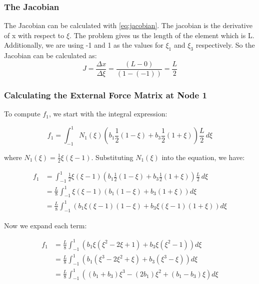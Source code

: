 \documentclass{article}
\begin{document}
\subsubsection*{The Jacobian}
The Jacobian can be calculated with \ref{eq:jacobian}. The jacobian is the derivative of x with respect to $\xi$. The problem gives us the 
length of the element which is L. Additionally, we are using -1 and 1 as the values for $\xi_1$ and $\xi_3$ respectively. So the Jacobian can
be calculated as:
\begin{equation*}
    J = \frac{\Delta x}{\Delta \xi} = \frac{(L-0)}{(1-(-1))} = \frac{L}{2}
\end{equation*}

\subsubsection*{Calculating the External Force Matrix at Node 1}

To compute \( f_1 \), we start with the integral expression:

\begin{equation}
    f_1 = \int_{-1}^{1} N_1(\xi) \left( b_1 \frac{1}{2}(1 - \xi) + b_3 \frac{1}{2}(1 + \xi) \right) \frac{L}{2} \, d\xi
\end{equation}

where \( N_1(\xi) = \frac{1}{2} \xi (\xi - 1) \). Substituting \( N_1(\xi) \) into the equation, we have:

\begin{align*}
    f_1 &= \int_{-1}^{1} \frac{1}{2} \xi (\xi - 1) \left( b_1 \frac{1}{2}(1 - \xi) + b_3 \frac{1}{2}(1 + \xi) \right) \frac{L}{2} \, d\xi \\
    &= \frac{L}{8} \int_{-1}^{1} \xi (\xi - 1) \left( b_1(1 - \xi) + b_3(1 + \xi) \right) d\xi \\
    &= \frac{L}{8} \int_{-1}^{1} \left( b_1 \xi (\xi - 1)(1 - \xi) + b_3 \xi (\xi - 1)(1 + \xi) \right) d\xi
\end{align*}

Now we expand each term:

\begin{align*}
    f_1 &= \frac{L}{8} \int_{-1}^{1} \left( b_1 \xi (\xi^2 - 2\xi + 1) + b_3 \xi (\xi^2 - 1) \right) d\xi \\
    &= \frac{L}{8} \int_{-1}^{1} \left( b_1 (\xi^3 - 2\xi^2 + \xi) + b_3 (\xi^3 - \xi) \right) d\xi \\
    &= \frac{L}{8} \int_{-1}^{1} \left( (b_1 + b_3) \xi^3 - (2b_1) \xi^2 + (b_1 - b_3) \xi \right) d\xi
\end{align*}
\end{document}
